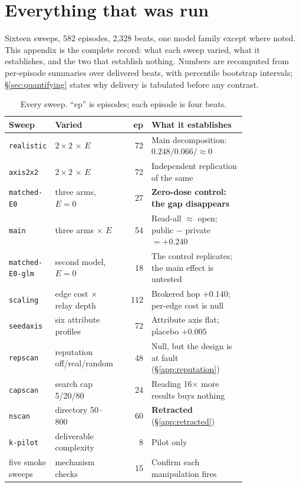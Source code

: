 \section{Everything that was run}
\label{app:experiments}

Sixteen sweeps, 582 episodes, 2{,}328 beats, one model family except where noted. This
appendix is the complete record: what each sweep varied, what it establishes, and the two
that establish nothing. Numbers are recomputed from per-episode summaries over delivered
beats, with percentile bootstrap intervals; \S\ref{sec:quantifying} states why delivery is
tabulated before any contrast.

\begin{table}[h]
\centering\small
\caption{Every sweep. ``ep'' is episodes; each episode is four beats.}
\label{tab:allruns}
\begin{tabular}{@{}p{0.14\linewidth}p{0.26\linewidth}r p{0.40\linewidth}@{}}
\toprule
\textbf{Sweep} & \textbf{Varied} & \textbf{ep} & \textbf{What it establishes} \\
\midrule
\texttt{realistic}   & $2\times2$ $\times$ $E$          & 72  & Main decomposition: $0.248 / 0.066 / \approx\!0$ \\
\texttt{axis2x2}     & $2\times2$ $\times$ $E$          & 72  & Independent replication of the same \\
\texttt{matched-E0}  & three arms, $E=0$                & 27  & \textbf{Zero-dose control: the gap disappears} \\
\texttt{main}        & three arms $\times$ $E$          & 54  & Read-all $\approx$ open; public $-$ private $=+0.240$ \\
\texttt{matched-E0-glm} & second model, $E=0$           & 18  & The control replicates; the main effect is untested \\
\texttt{scaling}     & edge cost $\times$ relay depth   & 112 & Brokered hop $+0.140$; per-edge cost is null \\
\texttt{seedaxis}    & six attribute profiles           & 72  & Attribute axis flat; placebo $+0.005$ \\
\texttt{repscan}     & reputation off/real/random       & 48  & Null, but the design is at fault (\S\ref{app:reputation}) \\
\texttt{capscan}     & search cap 5/20/80               & 24  & Reading 16$\times$ more results buys nothing \\
\texttt{nscan}       & directory 50--800                & 60  & \textbf{Retracted} (\S\ref{app:retracted}) \\
\texttt{k-pilot}     & deliverable complexity           & 8   & Pilot only \\
five smoke sweeps    & mechanism checks                 & 15  & Confirm each manipulation fires \\
\bottomrule
\end{tabular}
\end{table}

